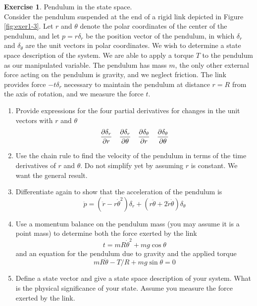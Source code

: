 \documentclass[11pt,a4paper]{report}
\theoremstyle{definition}\newtheorem{exercise}{Exercise}[chapter]
\begin{document}
\begin{exercise} Pendulum in the state space.\\
    Consider the pendulum suspended at the end of a rigid link depicted in Figure \ref{fig:exer1-3}. Let $r$ and $\theta$ denote the polar coordinates of the center of the pendulum, and let $p=r\delta_r$ be the position vector of the pendulum, in which $\delta_r$ and $\delta_\theta$ are the unit vectors in polar coordinates. We wish to determine a state space description of the system. We are able to apply a torque $T$ to the pendulum as our manipulated variable. The pendulum has mass $m$, the only other external force acting on the pendulum is gravity, and we neglect friction. The link provides force $-t\delta_r$ necessary to maintain the pendulum at distance $r=R$ from the axis of rotation, and we measure the force $t$.
    \begin{enumerate}[label=(\alph*)]
        \item Provide expressions for the four partial derivatives for changes in the unit vectors with $r$ and $\theta$
        \begin{equation}
            \pdv{\delta_r}{r}\quad
            \pdv{\delta_r}{\theta}\quad
            \pdv{\delta_\theta}{r}\quad
            \pdv{\delta_\theta}{\theta}
        \end{equation}
        \item Use the chain rule to find the velocity of the pendulum in terms of the time derivatives of $r$ and $\theta$. Do not simplify yet by assuming $r$ is constant. We want the general result.
        \item Differentiate again to show that the acceleration of the pendulum is
        \begin{equation}
            \ddot{p}=(\ddot{r}-r\dot{\theta}^2)\delta_r+(r\ddot{\theta}+2\dot r\dot \theta)\delta_\theta
        \end{equation}
        \item Use a momentum balance on the pendulum mass (you may assume it is a point mass) to determine both the force exerted by the link
        \begin{equation}
            t=mR\dot{\theta}^2+mg\cos \theta
        \end{equation}
        and an equation for the pendulum due to gravity and the applied torque 
        \begin{equation}
            mR\ddot \theta-T/R+mg\sin \theta=0
        \end{equation}
        \item Define a state vector and give a state space description of your system. What is the physical significance of your state. Assume you measure the force exerted by the link. 


\end{enumerate}
\end{exercise}
\end{document}
